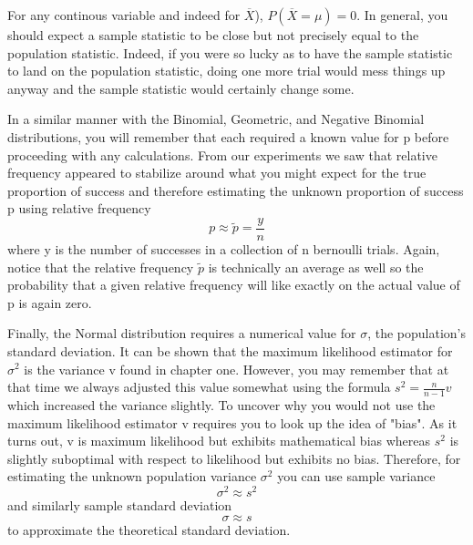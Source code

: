 \documentclass[10pt,]{book}
\theoremstyle{plain}
\theoremstyle{definition}
\theoremstyle{definition}
\theoremstyle{definition}
\numberwithin{equation}{section}
\begin{document}
For any continous variable and indeed for \(\overline{X}\)), \(P(\overline{X} = \mu) = 0\). In general, you should expect a sample statistic to be close but not precisely equal to the population statistic. Indeed, if you were so lucky as to have the sample statistic to land on the population statistic, doing one more trial would mess things up anyway and the sample statistic would certainly change some.
%
\par
In a similar manner with the Binomial, Geometric, and Negative Binomial distributions, you will remember that each required a known value for p before  proceeding with any calculations. From our experiments we saw that relative frequency appeared to stabilize around what you might expect for the true proportion of success and therefore estimating the unknown proportion of success p using relative frequency
\begin{equation*}p \approx \tilde{p} = \frac{y}{n}\end{equation*}
where y is the number of successes in a collection of n bernoulli trials. Again, notice that the relative frequency \(\tilde{p}\) is technically an average as well so the probability that a given relative frequency will like exactly on the actual value of p is again zero.
%
\par
Finally, the Normal distribution requires a numerical value for \(\sigma\), the population's standard deviation. It can be shown that the maximum likelihood estimator for \(\sigma^2\) is the variance v found in chapter one. However, you may remember that at that time we always adjusted this value somewhat using the formula \(s^2 = \frac{n}{n-1} v\) which increased the variance slightly. To uncover why you would not use the maximum likelihood estimator v requires you to look up the idea of "bias". As it turns out, v is maximum likelihood but exhibits mathematical bias whereas \(s^2\) is slightly suboptimal with respect to likelihood but exhibits no bias. Therefore, for estimating the unknown population variance \(\sigma^2\) you can use sample variance
\begin{equation*}\sigma^2 \approx s^2\end{equation*} 
and similarly sample standard deviation
\begin{equation*}\sigma \approx s\end{equation*}
to approximate the theoretical standard deviation. 
%
\typeout{************************************************}
\typeout{************************************************}
\end{document}
